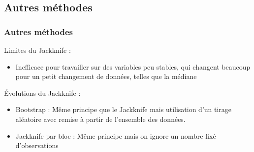 \documentclass[handout]{beamer}
\begin{document}
		\subsection{Autres méthodes}
		\begin{frame}
			\frametitle{Autres méthodes}
			Limites du Jackknife :
			\begin{itemize}
				\item Inefficace pour travailler sur des variables peu stables, qui changent beaucoup pour un petit changement de données, telles que la médiane
			\end{itemize}
			\vspace{15px}
			Évolutions du Jackknife :
			\begin{itemize}
				\item Bootstrap : Même principe que le Jackknife mais utilisation d'un tirage aléatoire avec remise à partir de l'ensemble des données.
				\item Jackknife par bloc : Même principe mais on ignore un nombre fixé d'observations
			\end{itemize}

		\end{frame}

%
%


\end{document}
